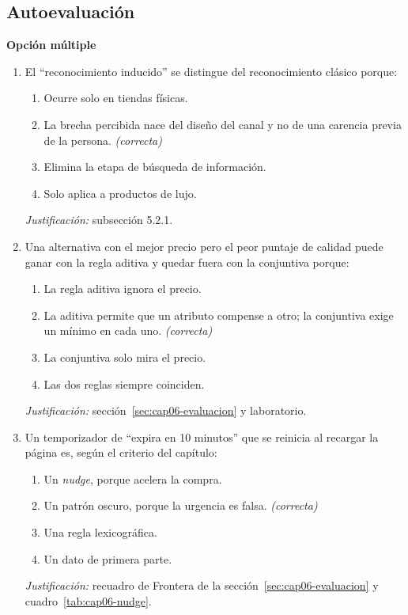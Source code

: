 \subsection*{Autoevaluación}

\textbf{Opción múltiple}

\begin{enumerate}
  \item El \enquote{reconocimiento inducido} se distingue del reconocimiento
  clásico porque:
  \begin{enumerate}
    \item[a)] Ocurre solo en tiendas físicas.
    \item[b)] La brecha percibida nace del diseño del canal y no de una carencia previa de la persona. \textit{(correcta)}
    \item[c)] Elimina la etapa de búsqueda de información.
    \item[d)] Solo aplica a productos de lujo.
  \end{enumerate}
  \textit{Justificación:} subsección 5.2.1.

  \item Una alternativa con el mejor precio pero el peor puntaje de calidad
  puede ganar con la regla aditiva y quedar fuera con la conjuntiva porque:
  \begin{enumerate}
    \item[a)] La regla aditiva ignora el precio.
    \item[b)] La aditiva permite que un atributo compense a otro; la conjuntiva exige un mínimo en cada uno. \textit{(correcta)}
    \item[c)] La conjuntiva solo mira el precio.
    \item[d)] Las dos reglas siempre coinciden.
  \end{enumerate}
  \textit{Justificación:} sección~\ref{sec:cap06-evaluacion} y laboratorio.

  \item Un temporizador de \enquote{expira en 10 minutos} que se reinicia al
  recargar la página es, según el criterio del capítulo:
  \begin{enumerate}
    \item[a)] Un \textit{nudge}, porque acelera la compra.
    \item[b)] Un patrón oscuro, porque la urgencia es falsa. \textit{(correcta)}
    \item[c)] Una regla lexicográfica.
    \item[d)] Un dato de primera parte.
  \end{enumerate}
  \textit{Justificación:} recuadro de Frontera de la sección~\ref{sec:cap06-evaluacion} y cuadro~\ref{tab:cap06-nudge}.
\end{enumerate}

